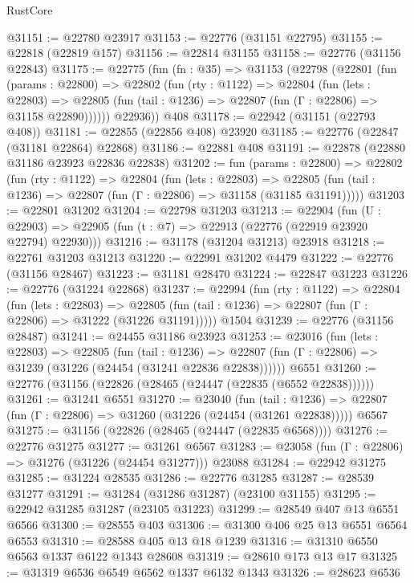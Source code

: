 \begin{lexlean}{RustCore}
\begin{coremodule}
@31151 := @22780 @23917
@31153 := @22776 (@31151 @22795)
@31155 := @22818 (@22819 @157)
@31156 := @22814 @31155
@31158 := @22776 (@31156 @22843)
@31175 := @22775
    (fun (fn : @35) =>
    @31153
      (@22798
        (@22801
          (fun (params : @22800) =>
          @22802
            (fun (rty : @1122) =>
            @22804
              (fun (lets : @22803) =>
              @22805 (fun (tail : @1236) => @22807 (fun (Γ : @22806) => @31158 @22890))))))
        @22936))
    @408
@31178 := @22942 (@31151 (@22793 @408))
@31181 := @22855 (@22856 @408) @23920
@31185 := @22776 (@22847 (@31181 @22864) @22868)
@31186 := @22881 @408
@31191 := @22878 (@22880 @31186 @23923 @22836 @22838)
@31202 := fun (params : @22800) =>
  @22802
    (fun (rty : @1122) =>
    @22804
      (fun (lets : @22803) =>
      @22805 (fun (tail : @1236) => @22807 (fun (Γ : @22806) => @31158 (@31185 @31191)))))
@31203 := @22801 @31202
@31204 := @22798 @31203
@31213 := @22904
    (fun (U : @22903) => @22905 (fun (t : @7) => @22913 (@22776 (@22919 @23920 @22794) @22930)))
@31216 := @31178 (@31204 @31213) @23918
@31218 := @22761 @31203 @31213
@31220 := @22991 @31202 @4479
@31222 := @22776 (@31156 @28467)
@31223 := @31181 @28470
@31224 := @22847 @31223
@31226 := @22776 (@31224 @22868)
@31237 := @22994
    (fun (rty : @1122) =>
    @22804
      (fun (lets : @22803) =>
      @22805 (fun (tail : @1236) => @22807 (fun (Γ : @22806) => @31222 (@31226 @31191)))))
    @1504
@31239 := @22776 (@31156 @28487)
@31241 := @24455 @31186 @23923
@31253 := @23016
    (fun (lets : @22803) =>
    @22805
      (fun (tail : @1236) =>
      @22807 (fun (Γ : @22806) => @31239 (@31226 (@24454 (@31241 @22836 @22838))))))
    @6551
@31260 := @22776 (@31156 (@22826 (@28465 (@24447 (@22835 (@6552 @22838))))))
@31261 := @31241 @6551
@31270 := @23040
    (fun (tail : @1236) => @22807 (fun (Γ : @22806) => @31260 (@31226 (@24454 (@31261 @22838)))))
    @6567
@31275 := @31156 (@22826 (@28465 (@24447 (@22835 @6568))))
@31276 := @22776 @31275
@31277 := @31261 @6567
@31283 := @23058 (fun (Γ : @22806) => @31276 (@31226 (@24454 @31277))) @23088
@31284 := @22942 @31275
@31285 := @31224 @28535
@31286 := @22776 @31285
@31287 := @28539 @31277
@31291 := @31284 (@31286 @31287) (@23100 @31155)
@31295 := @22942 @31285 @31287 (@23105 @31223)
@31299 := @28549 @407 @13 @6551 @6566
@31300 := @28555 @403
@31306 := @31300 @406 @25 @13 @6551 @6564 @6553
@31310 := @28588 @405 @13 @18 @1239
@31316 := @31310 @6550 @6563 @1337 @6122 @1343 @28608
@31319 := @28610 @173 @13 @17
@31325 := @31319 @6536 @6549 @6562 @1337 @6132 @1343
@31326 := @28623 @6536

\end{coremodule}
\end{lexlean}
